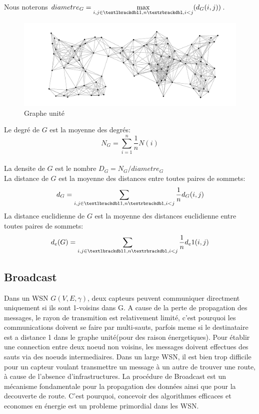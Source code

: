 \begin{mydef}
Nous noterons $diametre_G= \max\limits_{i,j\in \textlbrackdbl 1,n \textrbrackdbl,i<j} (d_G(i,j))$.
\end{mydef}
 

\begin{figure}[H]
\centering
\includegraphics[scale=0.5]{Etat_de_l'art/source/graph1.png}
\caption{Graphe unité}
\end{figure} 



\begin{mydef}
 
 Le degré de $G$ est la moyenne des degrés:$$N_G=\sum_{i=1}^n{\frac1n N(i)}$$\\
 La densite de $G$ est le nombre $D_G=N_G/diametre_G$\\
 La distance de $G$ est la moyenne des distances entre toutes paires de sommets:$$d_G=\sum_{i,j\in \textlbrackdbl 1,n \textrbrackdbl,i<j}{\frac1n d_G(i,j)}$$
 La distance euclidienne de $G$ est la moyenne des distances euclidienne entre toutes paires de sommets:$$d_e(G)=\sum_{i,j\in \textlbrackdbl 1,n \textrbrackdbl,i<j}{\frac1n d_e1(i,j)}$$

\end{mydef}

\subsection{Broadcast}

Dans un WSN $G(V,E,\gamma)$, deux capteurs peuvent communiquer directment uniquement si ils sont 1-voisins dans G.
A cause de la perte de propagation des messages, le rayon de transmition est relativement limité, c'est pourquoi les communications doivent se faire par multi-sauts, parfois meme si le destinataire est a distance 1 dans le graphe 
unité(pour des raison énergetiques). Pour établir une connection entre deux noeud non voisins, les messages doivent effectues des sauts via des noeuds intermediaires. Dans un large WSN, il est bien trop difficile pour un capteur voulant
transmettre un message à un autre de trouver une route, à cause de l'absence d'infrastructures. 
La procédure de Broadcast est un mécanisme fondamentale pour la propagation des données ainsi que pour la decouverte de route. C'est pourquoi, concevoir des algorithmes efficaces et economes en énergie est un probleme primordial 
dans les WSN. 

